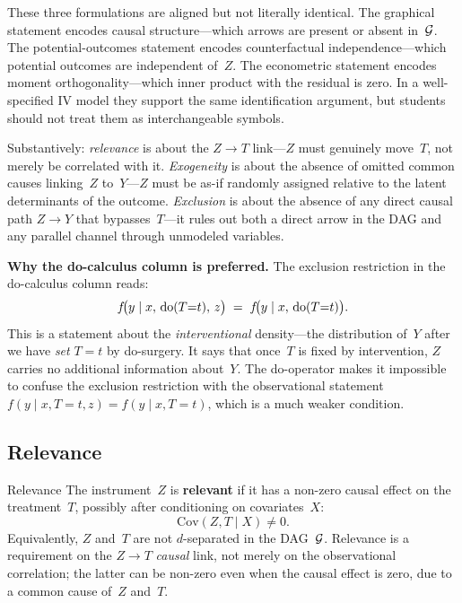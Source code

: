 \documentclass[master.tex]{subfiles}
\begin{document}
\begin{remark}
These three formulations are aligned but not literally identical.
The graphical statement encodes causal structure---which arrows are
present or absent in~$\mathcal{G}$.  The potential-outcomes statement
encodes counterfactual independence---which potential outcomes are
independent of~$Z$.  The econometric statement encodes moment
orthogonality---which inner product with the residual is zero.
In a well-specified IV model they support the same identification
argument, but students should not treat them as interchangeable
symbols.

Substantively: \emph{relevance} is about the $Z \to T$ link---$Z$
must genuinely move~$T$, not merely be correlated with it.
\emph{Exogeneity} is about the absence of omitted common causes
linking~$Z$ to~$Y$---$Z$ must be as-if randomly assigned relative
to the latent determinants of the outcome.  \emph{Exclusion} is
about the absence of any direct causal path $Z \to Y$ that
bypasses~$T$---it rules out both a direct arrow in the DAG and any
parallel channel through unmodeled variables.
\end{remark}

\medskip\noindent\textbf{Why the do-calculus column is preferred.}
The exclusion restriction in the do-calculus column reads:
\[
  f\!\bigl(y \mid x,\, \mathrm{do}(T{=}t),\, z\bigr)
  \;=\;
  f\!\bigl(y \mid x,\, \mathrm{do}(T{=}t)\bigr).
\]
This is a statement about the \emph{interventional} density---the
distribution of~$Y$ after we have \emph{set} $T = t$ by do-surgery.
It says that once~$T$ is fixed by intervention, $Z$ carries no
additional information about~$Y$.  The do-operator makes it
impossible to confuse the exclusion restriction with the
observational statement
$f(y \mid x, T{=}t, z) = f(y \mid x, T{=}t)$,
which is a much weaker condition.

\subsection{Relevance}

\begin{defn}{Relevance}
\label{w7:defn:relevance}
The instrument~$Z$ is \textbf{relevant} if it has a non-zero causal
effect on the treatment~$T$, possibly after conditioning on
covariates~$X$:
\[
  \mathrm{Cov}(Z, T \mid X) \neq 0.
\]
Equivalently, $Z$ and~$T$ are not $d$-separated in the DAG~$\mathcal{G}$.
Relevance is a requirement on the $Z \to T$ \emph{causal} link, not
merely on the observational correlation; the latter can be non-zero
even when the causal effect is zero, due to a common cause of~$Z$
and~$T$.
\end{defn}
\end{document}
